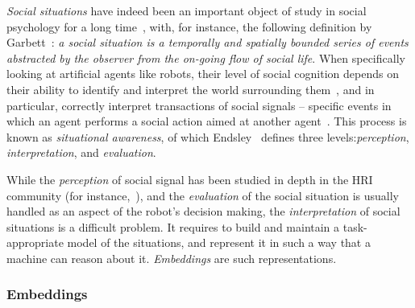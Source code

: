 \begin{rewrite}



\emph{Social situations} have indeed been an important object of study in social
psychology for a long time~\cite{argyle1981social}, with, for instance, the
following definition by Garbett~\cite{garbett1970analysis}: \emph{a social
situation is a temporally and spatially bounded series of events abstracted by
the observer from the on-going flow of social life}. When specifically looking
at artificial agents like robots, their level of social cognition depends on
their ability to identify and interpret the world surrounding
them~\cite{szczepanowski2017computational}, and in particular, correctly interpret
transactions of social signals -- specific events in which an agent performs a
social action aimed at another agent~\cite{pantic2011social}. This process is known as
\textit{situational awareness}, of which Endsley~\cite{endsley1995theory} defines
three levels:\emph{perception}, \emph{interpretation}, and \emph{evaluation}.

While the \emph{perception} of social signal has been studied in depth in the
HRI community (for instance,~\cite{pantic2011social}), and the \emph{evaluation} of
the social situation is usually handled as an aspect of the robot's decision
making, the \emph{interpretation} of social situations is a difficult problem.
It requires to build and maintain a task-appropriate model of the situations,
and represent it in such a way that a machine can reason about it.
\emph{Embeddings} are such representations.

\end{rewrite}

\subsubsection{Embeddings}

